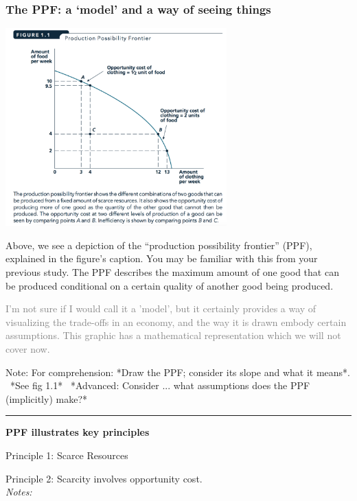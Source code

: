 \documentclass[]{article}
\begin{document}
\hypertarget{the-ppf-a-model-and-a-way-of-seeing-things}{%
\subsubsection{The PPF: a `model' and a way of seeing
things}\label{the-ppf-a-model-and-a-way-of-seeing-things}}

\includegraphics[height=3in]{picsfigs/PPF_text.png}

Above, we see a depiction of the ``production possibility frontier''
(PPF), explained in the figure's caption. You may be familiar with this
from your previous study. The PPF describes the maximum amount of one
good that can be produced conditional on a certain quality of another
good being produced.

\textcolor{gray}{I'm not sure if I would call it a 'model', but it certainly provides a way of visualizing the trade-offs in an economy, and the way it is drawn embody certain assumptions. This graphic has a mathematical representation which we will not cover now.}

Note:
\textcolor{RawSienna}{For comprehension: *Draw the PPF; consider its slope and what it means*. \ *See fig 1.1*  \ *Advanced: Consider ... what assumptions does the PPF (implicitly) make?*}

\begin{center}\rule{0.5\linewidth}{\linethickness}\end{center}

\textbf{PPF illustrates key principles}

Principle 1: Scarce Resources

Principle 2: Scarcity involves opportunity cost.\\

\emph{Notes:}
\end{document}
